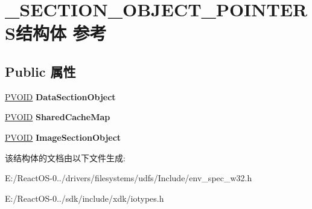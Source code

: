 \hypertarget{struct___s_e_c_t_i_o_n___o_b_j_e_c_t___p_o_i_n_t_e_r_s}{}\section{\+\_\+\+S\+E\+C\+T\+I\+O\+N\+\_\+\+O\+B\+J\+E\+C\+T\+\_\+\+P\+O\+I\+N\+T\+E\+R\+S结构体 参考}
\label{struct___s_e_c_t_i_o_n___o_b_j_e_c_t___p_o_i_n_t_e_r_s}
\subsection*{Public 属性}
\begin{DoxyCompactItemize}
\item 
\mbox{\label{struct___s_e_c_t_i_o_n___o_b_j_e_c_t___p_o_i_n_t_e_r_s_a8e44f59a3114959b946420283f12b0b0}} 
\hyperlink{interfacevoid}{P\+V\+O\+ID} {\bfseries Data\+Section\+Object}
\item 
\mbox{\label{struct___s_e_c_t_i_o_n___o_b_j_e_c_t___p_o_i_n_t_e_r_s_a96c5b886cac29fcb7d6eb44164e482f2}} 
\hyperlink{interfacevoid}{P\+V\+O\+ID} {\bfseries Shared\+Cache\+Map}
\item 
\mbox{\label{struct___s_e_c_t_i_o_n___o_b_j_e_c_t___p_o_i_n_t_e_r_s_a146a6e8b8b7d820a476c1d60b0c330a2}} 
\hyperlink{interfacevoid}{P\+V\+O\+ID} {\bfseries Image\+Section\+Object}
\end{DoxyCompactItemize}


该结构体的文档由以下文件生成\+:\begin{DoxyCompactItemize}
\item 
E\+:/\+React\+O\+S-\/0../drivers/filesystems/udfs/\+Include/env\+\_\+spec\+\_\+w32.\+h\item 
E\+:/\+React\+O\+S-\/0../sdk/include/xdk/iotypes.\+h\end{DoxyCompactItemize}
